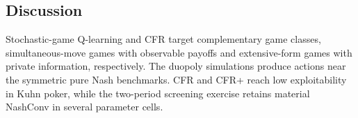 \subsection{Discussion}

Stochastic-game Q-learning and CFR target complementary game classes,
simultaneous-move games with observable payoffs and extensive-form
games with private information, respectively. The duopoly simulations
produce actions near the symmetric pure Nash benchmarks. CFR and CFR+
reach low exploitability in Kuhn poker, while the two-period screening
exercise retains material NashConv in several parameter cells.
